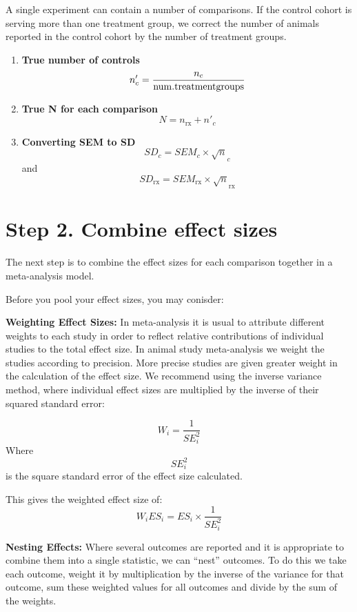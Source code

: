 \documentclass[
]{book}
\begin{document}
A single experiment can contain a number of comparisons. If the control cohort is serving more than one treatment group, we correct the number of animals reported in the control cohort by the number of treatment groups.

\begin{enumerate}
\def\labelenumi{(\arabic{enumi})}
\item
  \textbf{True number of controls}
  \[n'_c = \frac{n_c}{{\rm num. treatment groups}}\]
\item
  \textbf{True N for each comparison}
  \[N = n_{\text{rx}} + n'_c\]
\item
  \textbf{Converting SEM to SD}
  \[ SD_c = SEM_c \times \sqrt n_c \] and \[SD_{\text{rx}} = SEM_{\text{rx}} \times \sqrt n_{\text{rx}} \]
\end{enumerate}

\hypertarget{step-2.-combine-effect-sizes}{%
\section{Step 2. Combine effect sizes}\label{step-2.-combine-effect-sizes}}

The next step is to combine the effect sizes for each comparison together in a meta-analysis model.

Before you pool your effect sizes, you may conisder:

\textbf{Weighting Effect Sizes:}
In meta-analysis it is usual to attribute different weights to each study in order to reflect relative contributions of individual studies to the total effect size. In animal study meta-analysis we weight the studies according to precision. More precise studies are given greater weight in the calculation of the effect size. We recommend using the inverse variance method, where individual effect sizes are multiplied by the inverse of their squared standard error:

\[W_i = \frac{1}{SE^2_i} \]
Where \[{SE^2_i}\] is the square standard error of the effect size calculated.

This gives the weighted effect size of:
\[W_iES_i = ES_i \times \frac{1}{SE^2_i} \]

\textbf{Nesting Effects:}
Where several outcomes are reported and it is appropriate to combine them into a single statistic, we can ``nest'' outcomes. To do this we take each outcome, weight it by multiplication by the inverse of the variance for that outcome, sum these weighted values for all outcomes and divide by the sum of the weights.
\end{document}
